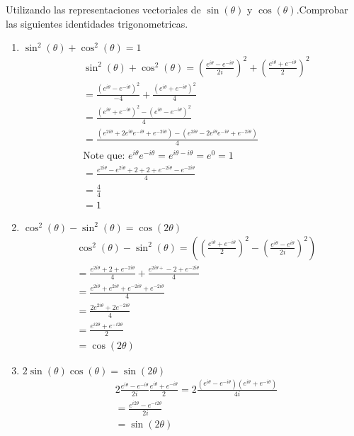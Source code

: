 \documentclass[12pt]{exam}
\begin{document}
Utilizando las representaciones vectoriales de $\sin(\theta)$ y $\cos(\theta)$.Comprobar las siguientes identidades trigonometricas.
		\begin{enumerate}
			\item $\sin^2(\theta)+\cos^2(\theta) = 1$
				\begin{align*}
					&\sin^2(\theta) + \cos^2(\theta) = \left(\frac{e^{i\theta}-e^{-i\theta}}{2i}\right)^2 + \left(\frac{e^{i\theta}+e^{-i\theta}}{2}\right)^2\\
					& =\frac{(e^{i\theta}-e^{-i\theta})^2}{-4} + \frac{(e^{i\theta}+e^{-i\theta})^2}{4}\\
					& =\frac{(e^{i\theta}+e^{-i\theta})^2-(e^{i\theta}-e^{-i\theta})^2}{4}\\
					& =\frac{(e^{2i\theta}+2e^{i\theta}e^{-i\theta}+e^{-2i\theta})-(e^{2i\theta}-2e^{i\theta}e^{-i\theta}+e^{-2i\theta})}{4}\\
					& \text{Note que: }e^{i\theta}e^{-i\theta} = e^{i\theta - i\theta}= e^{0} = 1\\
					& = \frac{e^{2i\theta}-e^{2i\theta}+2+2+e^{-2i\theta}-e^{-2i\theta}}{4}\\
					& = \frac{4}{4}\\
					& = 1 
				\end{align*}
			\item $\cos^2(\theta)-\sin^2(\theta)=\cos(2\theta)$
				\begin{align*}
					&\cos^2(\theta)-\sin^2(\theta) = \left(\left(\frac{e^{i\theta}+e^{-i\theta}}{2}\right)^2 - \left(\frac{e^{i\theta}-e^{i\theta}}{2i}\right)^2\right)\\
					&= \frac{e^{2i\theta}+2+e^{-2i\theta}}{4}+\frac{e^{2i\theta+}-2+e^{-2i\theta}}{4}\\
					&= \frac{e^{2i\theta}+e^{2i\theta}+e^{-2i\theta}+e^{-2i\theta}}{4}\\
					&= \frac{2e^{2i\theta}+2e^{-2i\theta}}{4}\\
					&= \frac{e^{i2\theta}+e^{-i2\theta}}{2}\\
					&= \cos(2\theta)
				\end{align*}
			\item $2\sin(\theta)\cos(\theta)=\sin(2\theta)$
				\begin{align*}
					&2\frac{e^{i\theta}-e^{-i\theta}}{2i}\frac{e^{i\theta}+e^{-i\theta}}{2} = 2\frac{(e^{i\theta}-e^{-i\theta})(e^{i\theta}+e^{-i\theta})}{4i}\\
					&= \frac{e^{i2\theta}-e^{-i2\theta}}{2i}\\
					&= \sin(2\theta)

\end{align*}
\end{enumerate}
\end{document}
